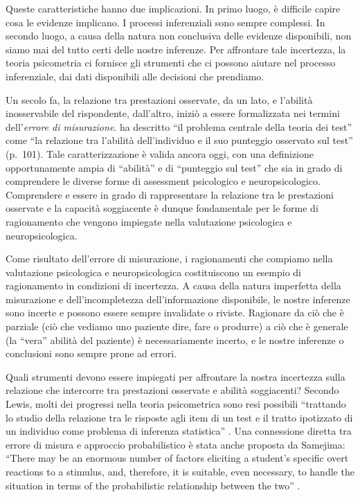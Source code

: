 \documentclass[
  11pt,
]{krantz}
\theoremstyle{definition}
\theoremstyle{definition}
\theoremstyle{definition}
\theoremstyle{definition}
\theoremstyle{remark}
\begin{document}
Queste caratteristiche hanno due implicazioni. In primo luogo, è difficile capire cosa le evidenze implicano. I processi inferenziali sono sempre complessi. In secondo luogo, a causa della natura non conclusiva delle evidenze disponibili, non siamo mai del tutto certi delle nostre inferenze. Per affrontare tale incertezza, la teoria psicometria ci fornisce gli strumenti che ci possono aiutare nel processo inferenziale, dai dati disponibili alle decisioni che prendiamo.

Un secolo fa, la relazione tra prestazioni osservate, da un lato, e l'abilità inosservabile del rispondente, dall'altro, iniziò a essere formalizzata nei termini dell'\emph{errore di misurazione}. \citet{gulliksen1961measurement} ha descritto ``il problema centrale della teoria dei test'' come ``la relazione tra l'abilità dell'individuo e il suo punteggio osservato sul test'' (p.~101). Tale caratterizzazione è valida ancora oggi, con una definizione opportunamente ampia di ``abilità'' e di ``punteggio sul test'' che sia in grado di comprendere le diverse forme di assessment psicologico e neuropsicologico. Comprendere e essere in grado di rappresentare la relazione tra le prestazioni osservate e la capacità soggiacente è dunque fondamentale per le forme di ragionamento che vengono impiegate nella valutazione psicologica e neuropsicologica.

Come risultato dell'errore di misurazione, i ragionamenti che compiamo nella valutazione psicologica e neuropsicologica costituiscono un esempio di ragionamento in condizioni di incertezza. A causa della natura imperfetta della misurazione e dell'incompletezza dell'informazione disponibile, le nostre inferenze sono incerte e possono essere sempre invalidate o riviste. Ragionare da ciò che è parziale (ciò che vediamo uno paziente dire, fare o produrre) a ciò che è generale (la ``vera'' abilità del paziente) è necessariamente incerto, e le nostre inferenze o conclusioni sono sempre prone ad errori.

Quali strumenti devono essere impiegati per affrontare la nostra incertezza sulla relazione che intercorre tra prestazioni osservate e abilità soggiacenti? Secondo Lewis, molti dei progressi nella teoria psicometrica sono resi possibili ``trattando lo studio della relazione tra le risposte agli item di un test e il tratto ipotizzato di un individuo come problema di inferenza statistica'' \citep{lewis1986test}. Una connessione diretta tra errore di misura e approccio probabilistico è stata anche proposta da Samejima: ``There may be an enormous number of factors eliciting a student's specific overt reactions to a stimulus, and, therefore, it is suitable, even necessary, to handle the situation in terms of the probabilistic relationship between the two'' \citep{samejima1983constant}.
\end{document}
